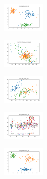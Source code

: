 \begin{figure}[H]
    \begin{subfigure}
        \centering
        \includegraphics[width=0.234\textwidth]{img/ageun/rand_set_const_20_277451237_clust.png}
    \end{subfigure}
    \hfill
    \begin{subfigure}
        \centering
        \includegraphics[width=0.234\textwidth]{img/ageun/newthyroid_set_const_20_277451237_clust.png}
    \end{subfigure}
    \hfill
    \begin{subfigure}
        \centering
        \includegraphics[width=0.234\textwidth]{img/ageun/iris_set_const_20_49258669_clust.png}
    \end{subfigure}
    \hfill
    \begin{subfigure}
        \centering
        \includegraphics[width=0.234\textwidth]{img/ageun/ecoli_set_const_20_49258669_clust.png}
    \end{subfigure}
    \hfill
    \begin{subfigure}
        \centering
        \includegraphics[width=0.234\textwidth]{img/ageun/rand_set_const_20_49258669_clust.png}
    \end{subfigure}
    \hfill
    \begin{subfigure}
        \centering

\end{subfigure}
\end{figure}
